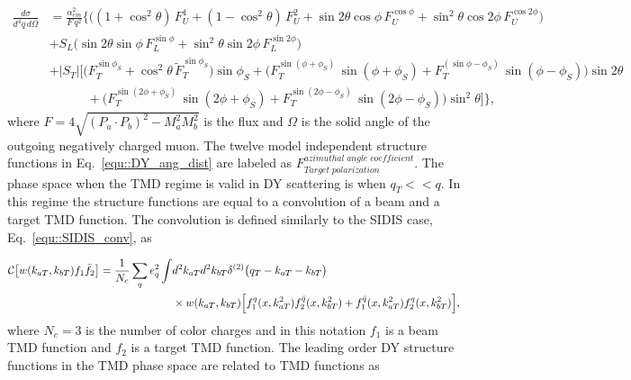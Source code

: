 \begin{align} \label{equ::DY_ang_dist}
  \frac{d\sigma}{d^4 q \, d \Omega} &=
  \frac{\alpha_{em}^2}{F \, q^2}
  \Big \{ \Big(
   (1 + \cos^2 \theta) \, F_{U}^{1} 
 + (1 - \cos^2 \theta) \, F_{U}^{2} 
 + \sin 2\theta \cos \phi \, F_{U}^{\cos \phi} 
 + \sin^2 \theta \cos 2\phi \, F_{U}^{\cos 2\phi} \Big)
 \nonumber \\
 &+ S_{L} \Big( 
   \sin 2\theta \sin \phi \, F_{L}^{\sin \phi} 
   + \sin^2 \theta \sin 2\phi \, F_{L}^{\sin 2\phi} \Big)
   \nonumber \\
   &+ |S_{T}|
   \Big[ \Big(
     F_{T}^{\sin \phi_S} + \cos^2 \theta \, \tilde{F}_{T}^{\sin \phi_S}
     \Big)\sin \phi_{S} 
     + \Big( F_{T}^{\sin (\phi +\phi_S)} \, \sin(\phi+\phi_S) +
     F_{T}^{(\sin \phi - \phi_S)}\, \sin(\phi-\phi_S) \Big)\sin 2\theta
     \nonumber \\
     & \quad\quad\quad +
     \Big( F_{T}^{\sin (2\phi +\phi_S)}\, \sin(2\phi+\phi_S) +
     F_{T}^{\sin (2\phi - \phi_S)}\, \sin(2\phi-\phi_S) \Big)\sin ^2\theta
     \Big ]
   \Big \},
\end{align}
\noindent
where $F = 4\sqrt{(P_a \cdot P_b)^2 - M_a^2M_b^2}$ is the flux and $\Omega$ is
the solid angle of the outgoing negatively charged muon.  The twelve model
independent structure functions in Eq.~\ref{equ::DY_ang_dist} are labeled as
$F_{Target \; polarization}^{azimuthal \;angle\;coefficient}$.  The phase space
when the TMD regime is valid in DY scattering is when $q_T << q$.  In this
regime the structure functions are equal to a convolution of a beam and a target
TMD function.  The convolution is defined similarly to the SIDIS case,
Eq.~\ref{equ::SIDIS_conv}, as

\begin{align}
  \label{equ::DY_conv}
  \nonumber
      {\cal C}\bigl[ w(k_{aT}, k_{bT}) f_1 \bar{f}_2 \bigr] =
      \frac{1}{N_c} \sum_q e_q^2 \int &d^2 k_{aT} d^2 k_{bT} 
      \delta^{(2)}\bigl(q_T - k_{aT} - k_{bT} \bigr) \\
      &\times w(k_{aT},k_{bT})
        \Big[ f_1^q(x,k_{aT}^2)f_2^{\bar{q}}(x,k_{bT}^2) +
          f_1^{\bar{q}}(x,k_{aT}^2)f_2^{q}(x,k_{bT}^2) \Big],
\end{align}
\noindent
where $N_c = 3$ is the number of color charges and in this notation $f_1$ is a
beam TMD function and $f_2$ is a target TMD function.  The leading order DY
structure functions in the TMD phase space are related to TMD functions
as~\cite{DYxSection}

